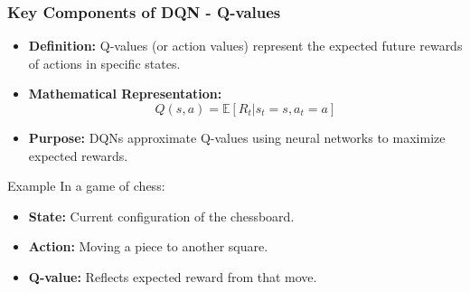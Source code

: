 \documentclass{beamer}
\begin{document}
\begin{frame}[fragile]
    \frametitle{Key Components of DQN - Q-values}
    \begin{itemize}
        \item \textbf{Definition:} Q-values (or action values) represent the expected future rewards of actions in specific states.
        \item \textbf{Mathematical Representation:}
        \begin{equation}
            Q(s, a) = \mathbb{E}[R_t | s_t = s, a_t = a]
        \end{equation}
        \item \textbf{Purpose:} DQNs approximate Q-values using neural networks to maximize expected rewards.
    \end{itemize}

    \begin{block}{Example}
        In a game of chess:
        \begin{itemize}
            \item \textbf{State:} Current configuration of the chessboard.
            \item \textbf{Action:} Moving a piece to another square.
            \item \textbf{Q-value:} Reflects expected reward from that move.
        \end{itemize}
    \end{block}
\end{frame}
\end{document}
